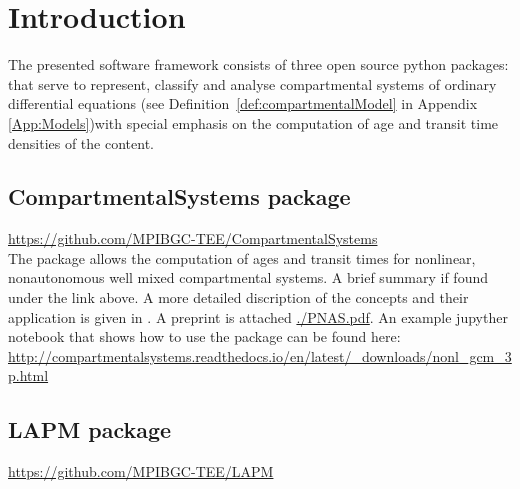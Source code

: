 \documentclass[a4paper]{article}
\DeclareRobustCommand{\Defref}[1]{\mbox{Definition \ref{#1}}}
\DeclareRobustCommand{\Appendixref}[1]{Appendix \ref{#1}}
\begin{document}
\section{Introduction}
The presented software framework consists of three open source python packages: \\
that serve to represent, classify and analyse compartmental systems of ordinary differential equations (see \Defref{def:compartmentalModel} in \Appendixref{App:Models})with special emphasis on the computation of age and transit time densities of the content.  

\subsection{CompartmentalSystems package}
\url{https://github.com/MPIBGC-TEE/CompartmentalSystems}\\
The package allows the computation of ages and transit times for nonlinear, nonautonomous well mixed compartmental systems.
A brief summary if found under the link above. A more detailed discription of the concepts and their application is given in \citet[]{MetzlerMuellerSierra2018PNAS}. A preprint is attached \url{./PNAS.pdf}.
An example jupyther notebook that shows how to use the package can be found here:
\url{http://compartmentalsystems.readthedocs.io/en/latest/_downloads/nonl_gcm_3p.html}

\subsection{LAPM package}
\url{https://github.com/MPIBGC-TEE/LAPM}\\
\end{document}
